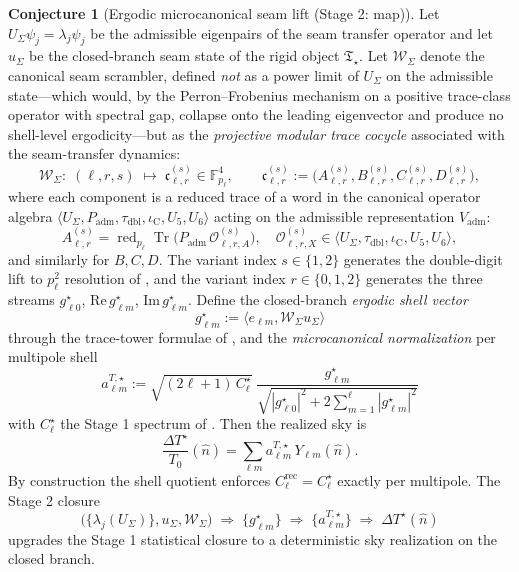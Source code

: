 \documentclass[11pt,a4paper]{article}
\theoremstyle{definition}
\newtheorem{conjecture}[theorem]{Conjecture}
\theoremstyle{remark}
\newcommand{\taudbl}{\tau_{\mathrm{dbl}}}
\newcommand{\iC}{\iota_{\mathrm C}}
\newcommand{\Padm}{P_{\mathrm{adm}}}
\newcommand{\Tstar}{\mathfrak T_{\star}}
\begin{document}
\begin{conjecture}[Ergodic microcanonical seam lift (Stage 2: map)]
\label{thm:cmb_seam_phase_realization}
Let $U_\Sigma\psi_j=\lambda_j\psi_j$ be the admissible eigenpairs of the seam transfer operator
and let $u_\Sigma$ be the closed-branch seam state of the rigid object $\Tstar$.  Let
$\mathcal W_\Sigma$ denote the canonical seam scrambler, defined \emph{not} as a power limit of
$U_\Sigma$ on the admissible state---which would, by the Perron--Frobenius mechanism on a positive
trace-class operator with spectral gap, collapse onto the leading eigenvector and produce no
shell-level ergodicity---but as the
\emph{projective modular trace cocycle} associated with the seam-transfer dynamics:
\[
\mathcal W_\Sigma:\;
(\ell,r,s)\;\longmapsto\;\mathfrak c_{\ell,r}^{(s)}\in\mathbb F_{p_\ell}^4,
\qquad
\mathfrak c_{\ell,r}^{(s)}
:=
\bigl(A_{\ell,r}^{(s)},B_{\ell,r}^{(s)},C_{\ell,r}^{(s)},D_{\ell,r}^{(s)}\bigr),
\]
where each component is a reduced trace of a word in the canonical operator algebra
\(
\langle U_\Sigma,\Padm,\taudbl,\iC,U_5,U_6\rangle
\)
acting on the admissible representation $V_{\mathrm{adm}}$:
\[
A_{\ell,r}^{(s)}=
\operatorname{red}_{p_\ell}
\operatorname{Tr}\bigl(\Padm\,\mathcal O_{\ell,r,A}^{(s)}\bigr),
\quad
\mathcal O_{\ell,r,X}^{(s)}\in\langle U_\Sigma,\taudbl,\iC,U_5,U_6\rangle,
\]
and similarly for $B,C,D$. The variant index $s\in\{1,2\}$ generates the
double-digit lift to $p_\ell^2$ resolution of , and the variant
index $r\in\{0,1,2\}$ generates the three streams $g_{\ell 0}^\star$,
$\mathrm{Re}\,g_{\ell m}^\star$, $\mathrm{Im}\,g_{\ell m}^\star$. Define the closed-branch
\emph{ergodic shell vector}
\[
g_{\ell m}^{\star}
:=
\langle e_{\ell m},\mathcal W_\Sigma u_\Sigma\rangle
\]
through the trace-tower formulae of , and the
\emph{microcanonical normalization} per multipole shell
\[
\boxed{\;
a_{\ell m}^{T,\star}
:=
\sqrt{(2\ell+1)\,C_\ell^\star}\;
\frac{g_{\ell m}^{\star}}{\sqrt{|g_{\ell 0}^{\star}|^2
+2\sum_{m=1}^{\ell}|g_{\ell m}^{\star}|^2}}\;}
\]
with $C_\ell^\star$ the Stage 1 spectrum of
.  Then the realized sky is
\[
\frac{\Delta T^\star}{T_0}(\hat n)
=
\sum_{\ell m}a_{\ell m}^{T,\star}\,Y_{\ell m}(\hat n).
\]
By construction the shell quotient enforces
$C_\ell^{\mathrm{rec}}=C_\ell^\star$ exactly per multipole. The Stage 2 closure
\[
\bigl(\{\lambda_j(U_\Sigma)\},u_\Sigma,\mathcal W_\Sigma\bigr)
\;\Longrightarrow\;
\{g_{\ell m}^{\star}\}
\;\Longrightarrow\;
\{a_{\ell m}^{T,\star}\}
\;\Longrightarrow\;
\Delta T^\star(\hat n)
\]
upgrades the Stage 1 statistical closure to a deterministic sky realization on the closed branch.
\end{conjecture}
\end{document}
